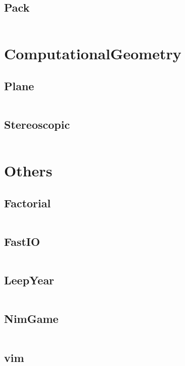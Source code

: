 \documentclass[a4paper,11pt]{article}
\begin{document}
\subsection{Pack}
\inputminted[breaklines]{c++}{05++DynamicProgramming/+Pack.cpp}

\newpage
\section{ComputationalGeometry}
\subsection{Plane}
\inputminted[breaklines]{c++}{06++ComputationalGeometry/+Plane.cpp}
\subsection{Stereoscopic}
\inputminted[breaklines]{c++}{06++ComputationalGeometry/+Stereoscopic.cpp}

\newpage
\section{Others}
\subsection{Factorial}
\inputminted[breaklines]{c++}{07++Others/+Factorial.cpp}
\subsection{FastIO}
\inputminted[breaklines]{c++}{07++Others/+FastIO.cpp}
\subsection{LeepYear}
\inputminted[breaklines]{c++}{07++Others/+LeepYear.cpp}
\subsection{NimGame}
\inputminted[breaklines]{c++}{07++Others/+NimGame.cpp}
\subsection{vim}
\inputminted[breaklines]{c++}{07++Others/+vim.vim}

\newpage
\end{document}
